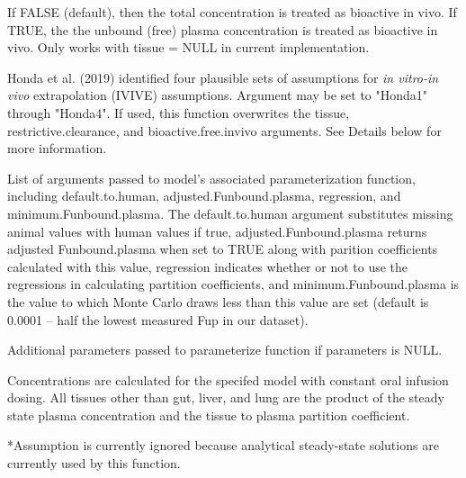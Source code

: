\documentclass[a4paper]{book}
\begin{document}
\begin{Arguments}
\begin{ldescription}
\item[\code{bioactive.free.invivo}] If FALSE (default), then the total concentration is treated
as bioactive in vivo. If TRUE, the the unbound (free) plasma concentration is treated as 
bioactive in vivo. Only works with tissue = NULL in current implementation.

\item[\code{IVIVE}] Honda et al. (2019) identified four plausible sets of 
assumptions for \emph{in vitro-in vivo} extrapolation (IVIVE) assumptions. 
Argument may be set to "Honda1" through "Honda4". If used, this function 
overwrites the tissue, restrictive.clearance, and bioactive.free.invivo arguments. 
See Details below for more information.

\item[\code{parameterize.args}] List of arguments passed to model's associated
parameterization function, including default.to.human, 
adjusted.Funbound.plasma, regression, and minimum.Funbound.plasma. The 
default.to.human argument substitutes missing animal values with human values
if true, adjusted.Funbound.plasma returns adjusted Funbound.plasma when set 
to TRUE along with parition coefficients calculated with this value, 
regression indicates whether or not to use the regressions in calculating
partition coefficients, and minimum.Funbound.plasma is the value to which
Monte Carlo draws less than this value are set (default is 0.0001 -- half
the lowest measured Fup in our dataset).

\item[\code{...}] Additional parameters passed to parameterize function if 
parameters is NULL.
\end{ldescription}
\end{Arguments}
%
\begin{Details}\relax
Concentrations are calculated for the specifed model with constant 
oral infusion dosing.  All tissues other than gut, liver, and lung are the 
product of the steady state plasma concentration and the tissue to plasma 
partition coefficient. 

*Assumption is currently ignored because analytical steady-state solutions are currently used by this function.
\end{Details}
\end{document}

